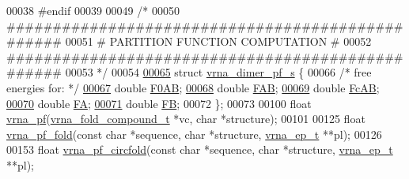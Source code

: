 \begin{DoxyCode}
00038 \textcolor{preprocessor}{#endif}
00039 
00049 \textcolor{comment}{/*}
00050 \textcolor{comment}{#################################################}
00051 \textcolor{comment}{# PARTITION FUNCTION COMPUTATION                #}
00052 \textcolor{comment}{#################################################}
00053 \textcolor{comment}{*/}
00054 
\mbox{\hyperlink{group__pf__cofold}{00065}} \textcolor{keyword}{struct }\mbox{\hyperlink{group__pf__cofold_structvrna__dimer__pf__s}{vrna\_dimer\_pf\_s}} \{
00066   \textcolor{comment}{/* free energies for: */}
\mbox{\hyperlink{group__pf__cofold_a82e31d1fb6e95923fab6036f52c370af}{00067}}   \textcolor{keywordtype}{double}  \mbox{\hyperlink{group__pf__cofold_a82e31d1fb6e95923fab6036f52c370af}{F0AB}}; 
\mbox{\hyperlink{group__pf__cofold_a01a87f59db2b7fbf883b056e6f6c673a}{00068}}   \textcolor{keywordtype}{double}  \mbox{\hyperlink{group__pf__cofold_a01a87f59db2b7fbf883b056e6f6c673a}{FAB}};  
\mbox{\hyperlink{group__pf__cofold_a7b01cea5721f61badebc29cf0a9c4266}{00069}}   \textcolor{keywordtype}{double}  \mbox{\hyperlink{group__pf__cofold_a7b01cea5721f61badebc29cf0a9c4266}{FcAB}}; 
\mbox{\hyperlink{group__pf__cofold_a1aca57247f2c023d08028b1919005b0a}{00070}}   \textcolor{keywordtype}{double}  \mbox{\hyperlink{group__pf__cofold_a1aca57247f2c023d08028b1919005b0a}{FA}};   
\mbox{\hyperlink{group__pf__cofold_ab4d307be5400604d3c1d84d58a9981df}{00071}}   \textcolor{keywordtype}{double}  \mbox{\hyperlink{group__pf__cofold_ab4d307be5400604d3c1d84d58a9981df}{FB}};   
00072 \};
00073 
00100 \textcolor{keywordtype}{float} \mbox{\hyperlink{group__pf__fold_ga29e256d688ad221b78d37f427e0e99bc}{vrna\_pf}}(\mbox{\hyperlink{group__fold__compound_structvrna__fc__s}{vrna\_fold\_compound\_t}} *vc, \textcolor{keywordtype}{char} *structure);
00101 
00125 \textcolor{keywordtype}{float} \mbox{\hyperlink{group__pf__fold_gac4a2a74a79e49818bc35412a2b392c7e}{vrna\_pf\_fold}}(\textcolor{keyword}{const} \textcolor{keywordtype}{char} *sequence, \textcolor{keywordtype}{char} *structure, \mbox{\hyperlink{group__struct__utils_structvrna__elem__prob__s}{vrna\_ep\_t}} **pl);
00126 
00153 \textcolor{keywordtype}{float} \mbox{\hyperlink{group__pf__fold_ga87e5a77b6e50dd54e9d032a9b92973be}{vrna\_pf\_circfold}}(\textcolor{keyword}{const} \textcolor{keywordtype}{char} *sequence, \textcolor{keywordtype}{char} *structure, 
      \mbox{\hyperlink{group__struct__utils_structvrna__elem__prob__s}{vrna\_ep\_t}} **pl);

\end{DoxyCode}
